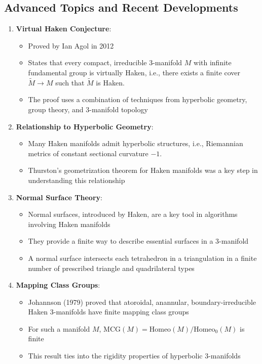 \documentclass{article}
\begin{document}
\subsection{Advanced Topics and Recent Developments}

\begin{enumerate}
  \item \textbf{Virtual Haken Conjecture}:
  \begin{itemize}
    \item Proved by Ian Agol in 2012
    \item States that every compact, irreducible 3-manifold $M$ with infinite fundamental group is virtually Haken, i.e., there exists a finite cover $\tilde{M} \to M$ such that $\tilde{M}$ is Haken.
    \item The proof uses a combination of techniques from hyperbolic geometry, group theory, and 3-manifold topology
  \end{itemize}
  
  \item \textbf{Relationship to Hyperbolic Geometry}:
  \begin{itemize}
    \item Many Haken manifolds admit hyperbolic structures, i.e., Riemannian metrics of constant sectional curvature $-1$.
    \item Thurston's geometrization theorem for Haken manifolds was a key step in understanding this relationship
  \end{itemize}
  
  \item \textbf{Normal Surface Theory}:
  \begin{itemize}
    \item Normal surfaces, introduced by Haken, are a key tool in algorithms involving Haken manifolds
    \item They provide a finite way to describe essential surfaces in a 3-manifold
    \item A normal surface intersects each tetrahedron in a triangulation in a finite number of prescribed triangle and quadrilateral types
  \end{itemize}
  
  \item \textbf{Mapping Class Groups}:
  \begin{itemize}
    \item Johannson (1979) proved that atoroidal, anannular, boundary-irreducible Haken 3-manifolds have finite mapping class groups
    \item For such a manifold $M$, $\text{MCG}(M) = \text{Homeo}(M) / \text{Homeo}_0(M)$ is finite
    \item This result ties into the rigidity properties of hyperbolic 3-manifolds
  \end{itemize}
  

\end{enumerate}
\end{document}
